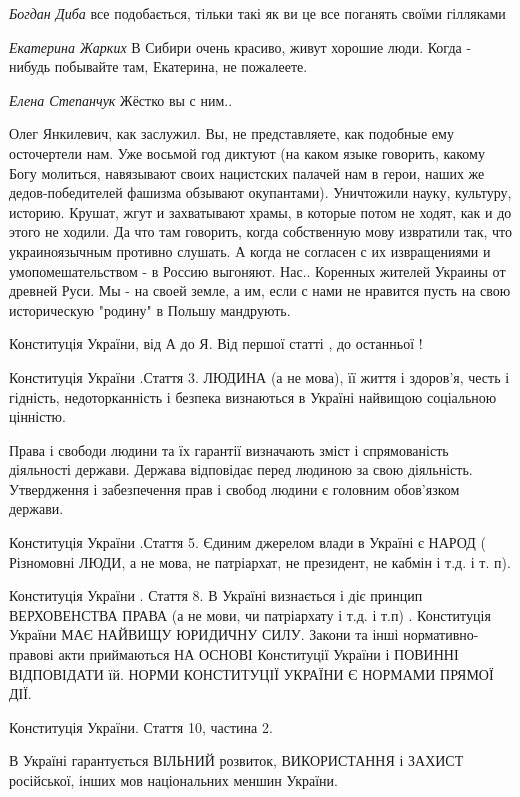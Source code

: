 \begin{itemize}
\emph{Богдан Диба}
все подобається, тільки такі як ви це все поганять своїми гілляками

\emph{Екатерина Жарких}
В Сибири очень красиво, живут хорошие люди. Когда - нибудь побывайте там, Екатерина, не пожалеете. 

\emph{Елена Степанчук}
Жёстко вы с ним.. 


Олег Янкилевич, как заслужил. Вы, не представляете, как подобные ему
осточертели нам. Уже восьмой год диктуют (на каком языке говорить, какому Богу
молиться, навязывают своих нацистских палачей нам в герои, наших же
дедов-победителей фашизма обзывают окупантами). Уничтожили науку, культуру,
историю. Крушат, жгут и захватывают храмы, в которые потом не ходят, как и до
этого не ходили. Да что там говорить, когда собственную мову извратили так, что
украиноязычным противно слушать. А когда не согласен с их извращениями и
умопомешательством - в Россию выгоняют. Нас.. Коренных жителей Украины от
древней Руси. Мы - на своей земле, а им, если с нами не нравится пусть на свою
историческую "родину" в Польшу мандрують.


Конституція України, від А до Я. Від першої статті , до останньої !

Конституція України .Стаття 3. ЛЮДИНА (а не мова), її життя і здоров'я, честь і гідність, недоторканність і безпека визнаються в Україні найвищою соціальною цінністю.

Права і свободи людини та їх гарантії визначають зміст і спрямованість
діяльності держави. Держава відповідає перед людиною за свою діяльність.
Утвердження і забезпечення прав і свобод людини є головним обов'язком держави.

Конституція України .Стаття 5. Єдиним джерелом влади в Україні є НАРОД (
Різномовні ЛЮДИ, а не мова, не патріархат, не президент, не кабмін і т.д. і т.
п).

Конституція України . Стаття 8. В Україні визнається і діє принцип ВЕРХОВЕНСТВА
ПРАВА (а не мови, чи патріархату і т.д. і т.п) . Конституція України МАЄ
НАЙВИЩУ ЮРИДИЧНУ СИЛУ. Закони та інші нормативно-правові акти приймаються НА
ОСНОВІ Конституції України і ПОВИННІ ВІДПОВІДАТИ їй. НОРМИ КОНСТИТУЦІЇ УКРАЇНИ
Є НОРМАМИ ПРЯМОЇ ДІЇ.

Конституція України. Стаття 10, частина 2.

В Україні гарантується ВІЛЬНИЙ розвиток, ВИКОРИСТАННЯ і ЗАХИСТ російської,
інших мов національних меншин України.


\end{itemize}
